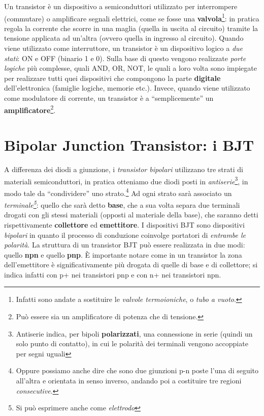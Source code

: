 \documentclass[
]{book}
\begin{document}
Un transistor è un dispositivo a semiconduttori utilizzato per
interrompere (commutare) o amplificare segnali elettrici, come se fosse
una \textbf{valvola}\footnote{Infatti sono andate a sostituire le
  \emph{valvole termoioniche}, o \emph{tubo a vuoto}.}: in pratica
regola la corrente che scorre in una maglia (quella in uscita al
circuito) tramite la tensione applicata ad un'altra (ovvero quella in
ingresso al circuito). \newline Quando viene utilizzato come
interruttore, un transistor è un dispositivo logico a \emph{due stati}:
ON e OFF (binario 1 e 0). Sulla base di questo vengono realizzate
\emph{porte logiche} più complesse, quali AND, OR, NOT, le quali a loro
volta sono impiegate per realizzare tutti quei dispositivi che
compongono la parte \textbf{digitale} dell'elettronica (famiglie
logiche, memorie etc.). \newline Invece, quando viene utilizzato come
modulatore di corrente, un transistor è a ``semplicemente'' un
\textbf{amplificatore}\footnote{Può essere sia un amplificatore di
  potenza che di tensione.}.

\section{Bipolar Junction Transistor: i
BJT}\label{bipolar-junction-transistor-i-bjt}

A differenza dei diodi a giunzione, i \emph{transistor bipolari}
utilizzano tre strati di materiali semiconduttori, in pratica otteniamo
due diodi posti in \emph{antiserie}\footnote{Antiserie indica, per
  bipoli \textbf{polarizzati}, una connessione in serie (quindi un solo
  punto di contatto), in cui le polarità dei terminali vengono
  accoppiate per segni uguali}, in modo tale da ``condividere'' uno
strato.\footnote{Oppure possiamo anche dire che sono due giunzioni p-n
  poste l'una di seguito all'altra e orientata in senso inverso, andando
  poi a costituire tre regioni \emph{consecutive}.} \newline Ad ogni
strato sarà associato un \emph{terminale\footnote{Si può esprimere anche
  come \emph{elettrodo}}}: quello che sarà detto \textbf{base}, che a
sua volta separa due terminali drogati con gli stessi materiali (opposti
al materiale della base), che saranno detti rispettivamente
\textbf{collettore} ed \textbf{emettitore}. \newline I dispositivi BJT
sono dispositivi \emph{bipolari} in quanto il processo di conduzione
coinvolge portatori di \emph{entrambe le polarità}. \newline La
struttura di un transistor BJT può essere realizzata in due modi: quello
\textbf{npn} e quello \textbf{pnp}. È importante notare come in un
transistor la zona dell'emettitore è significativamente più drogata di
quelle di base e di collettore; si indica infatti con p+ nei transistori
pnp e con n+ nei transistori npn.
\end{document}
